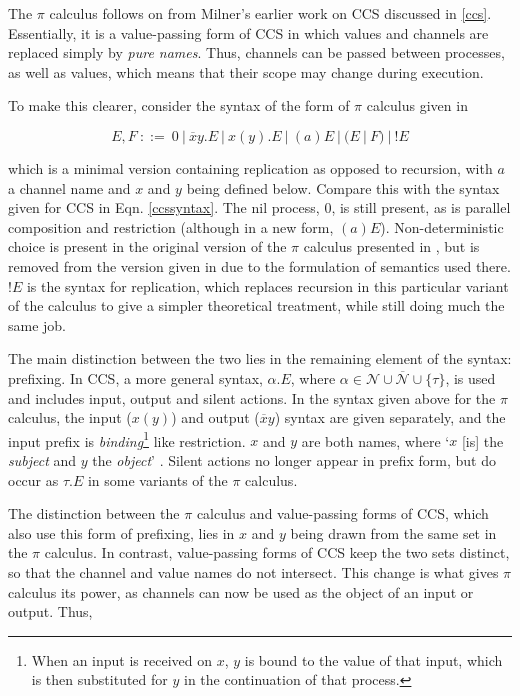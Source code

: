 The $\pi$ calculus follows on from Milner's earlier work on CCS
discussed in \ref{ccs}. Essentially, it is a value-passing form of CCS
in which values and channels are replaced simply by \emph{pure names}.
Thus, channels can be passed between processes, as well as values,
which means that their scope may change during execution.

To make this clearer, consider the syntax of the form of $\pi$ calculus
given in \cite{funcproc}

\begin{equation}
\label{pisyntax}
  E, F\ ::=\ 
  0\ |\ 
  \overline{x}y.E\ |\ 
  x(y).E\ |\ 
  (a)E\ |\ 
  (E\ |\ F)\ |\ 
  !E
\end{equation}
  
\noindent which is a minimal version containing replication as opposed
to recursion, with $a$ a channel name and $x$ and $y$ being defined
below.  Compare this with the syntax given for CCS in Eqn.
\ref{ccssyntax}.  The nil process, $0$, is still present, as is parallel
composition and restriction (although in a new form, $(a)E$).
Non-deterministic choice is present in the original version of the $\pi$
calculus presented in \cite{picalctutorial}, but is removed from the
version given in \cite{funcproc} due to the formulation of semantics
used there.  $!E$ is the syntax for replication, which replaces
recursion in this particular variant of the calculus to give a simpler
theoretical treatment, while still doing much the same job.

The main distinction between the two lies in the remaining element of
the syntax: prefixing.  In CCS, a more general syntax, $\alpha.E$,
where $\alpha \in \mathcal{N} \cup \overline{\mathcal{N}} \cup
\{\tau\}$, is used and includes input, output and silent actions.  In
the syntax given above for the $\pi$ calculus, the input ($x(y)$) and
output ($\overline{x}y$) syntax are given separately, and the input
prefix is \emph{binding}\footnote{When an input is received on $x$,
  $y$ is bound to the value of that input, which is then substituted
  for $y$ in the continuation of that process.} like restriction. $x$
and $y$ are both names, where `$x$ [is] the \emph{subject} and $y$ the
\emph{object}' \cite{funcproc}.  Silent actions no longer appear in
prefix form, but do occur as $\tau.E$ in some variants of the $\pi$
calculus.

The distinction between the $\pi$ calculus and value-passing forms of
CCS, which also use this form of prefixing, lies in $x$ and $y$ being
drawn from the same set in the $\pi$ calculus.  In contrast,
value-passing forms of CCS keep the two sets distinct, so that the
channel and value names do not intersect.  This change is what
gives $\pi$ calculus its power, as channels can now be used as the
object of an input or output.  Thus,

